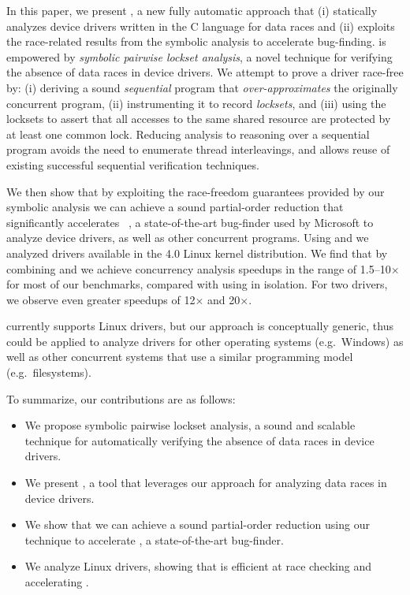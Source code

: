 In this paper, we present \whoop, a new fully automatic approach that (i) statically analyzes device drivers written in the C language for data races and (ii) exploits the race-related results from the symbolic analysis to accelerate bug-finding. \whoop is empowered by \emph{symbolic pairwise lockset analysis}, a novel technique for verifying the absence of data races in device drivers. We attempt to prove a driver race-free by: (i) deriving a sound \emph{sequential} program that \emph{over-approximates} the originally concurrent program, (ii) instrumenting it to record \emph{locksets}, and (iii) using the locksets to assert that all accesses to the same shared resource are protected by at least one common lock. Reducing analysis to reasoning over a sequential program avoids the need to enumerate thread interleavings, and allows reuse of existing successful sequential verification techniques.

We then show that by exploiting the race-freedom guarantees provided by our symbolic analysis we can achieve a sound partial-order reduction that significantly accelerates \corral~\cite{lal2012corral}, a state-of-the-art bug-finder used by Microsoft to analyze device drivers, as well as other concurrent programs. Using \whoop and \corral we analyzed \sizeOfBenchmarks drivers available in the 4.0 Linux kernel distribution.  We find that by combining \whoop and \corral we achieve concurrency analysis speedups in the range of 1.5--10$\times$ for most of our benchmarks, compared with using \corral in isolation.  For two drivers, we observe even greater speedups of 12$\times$ and 20$\times$.

\whoop currently supports Linux drivers, but our approach is conceptually generic, thus could be applied to analyze drivers for other operating systems (e.g.\ Windows) as well as other concurrent systems that use a similar programming model (e.g.\ filesystems).

To summarize, our contributions are as follows:
\begin{itemize}
\item We propose symbolic pairwise lockset analysis, a sound and scalable technique for automatically verifying the absence of data races in device drivers.
\item We present \whoop, a tool that leverages our approach for analyzing data races in device drivers.
\item We show that we can achieve a sound partial-order reduction using our technique to accelerate \corral, a state-of-the-art bug-finder.
\item We analyze \sizeOfBenchmarks Linux drivers, showing that \whoop is efficient at race checking and accelerating \corral.
\end{itemize}
